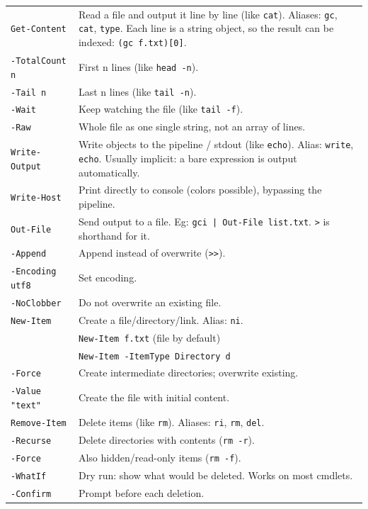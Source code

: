 \begin{tabularx}{\linewidth}{lX}
    \texttt{Get-Content} & Read a file and output it line by line (like \texttt{cat}). Aliases: \texttt{gc}, \texttt{cat}, \texttt{type}. Each line is a string object, so the result can be indexed: \texttt{(gc f.txt)[0]}.\\
    \texttt{-TotalCount n} & First n lines (like \texttt{head -n}).\\
    \texttt{-Tail n} & Last n lines (like \texttt{tail -n}).\\
    \texttt{-Wait} & Keep watching the file (like \texttt{tail -f}).\\
    \texttt{-Raw} & Whole file as one single string, not an array of lines.\\
    \hline
    \texttt{Write-Output} & Write objects to the pipeline / stdout (like \texttt{echo}). Alias: \texttt{write}, \texttt{echo}. Usually implicit: a bare expression is output automatically.\\
    \texttt{Write-Host} & Print directly to console (colors possible), bypassing the pipeline.\\
    \hline
    \texttt{Out-File} & Send output to a file. Eg: \texttt{gci | Out-File list.txt}. \texttt{>} is shorthand for it.\\
    \texttt{-Append} & Append instead of overwrite (\texttt{>>}).\\
    \texttt{-Encoding utf8} & Set encoding.\\
    \texttt{-NoClobber} & Do not overwrite an existing file.\\
    \hline
    \texttt{New-Item} & Create a file/directory/link. Alias: \texttt{ni}.\\
    & \texttt{New-Item f.txt} (file by default)\\
    & \texttt{New-Item -ItemType Directory d}\\
    \texttt{-Force} & Create intermediate directories; overwrite existing.\\
    \texttt{-Value "text"} & Create the file with initial content.\\
    \hline
    \texttt{Remove-Item} & Delete items (like \texttt{rm}). Aliases: \texttt{ri}, \texttt{rm}, \texttt{del}.\\
    \texttt{-Recurse} & Delete directories with contents (\texttt{rm -r}).\\
    \texttt{-Force} & Also hidden/read-only items (\texttt{rm -f}).\\
    \texttt{-WhatIf} & Dry run: show what would be deleted. Works on most cmdlets.\\
    \texttt{-Confirm} & Prompt before each deletion.\\
    \hline
\end{tabularx}

